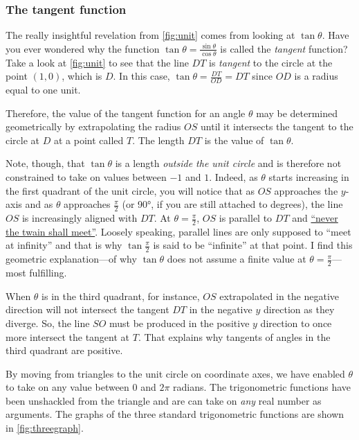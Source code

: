 \documentclass[
  a4paper,
]{article}
\begin{document}
\hypertarget{the-tangent-function}{%
\subsubsection{The tangent function}\label{the-tangent-function}}

The really insightful revelation from \cref{fig:unit} comes from looking
at \(\tan\theta\). Have you ever wondered why the function
\(\tan\theta = \frac{\sin\theta}{\cos\theta}\) is called the
\emph{tangent} function? Take a look at \cref{fig:unit} to see that the
line \(DT\) is \emph{tangent} to the circle at the point \((1, 0)\),
which is \(D\). In this case, \(\tan\theta = \frac{DT}{OD} = DT\) since
\(OD\) is a radius equal to one unit.

Therefore, the value of the tangent function for an angle \(\theta\) may
be determined geometrically by extrapolating the radius \(OS\) until it
intersects the tangent to the circle at \(D\) at a point called \(T\).
The length \(DT\) is the value of \(\tan\theta\).

Note, though, that \(\tan\theta\) is a length \emph{outside the unit
circle} and is therefore not constrained to take on values between
\(-1\) and \(1\). Indeed, as \(\theta\) starts increasing in the first
quadrant of the unit circle, you will notice that as \(OS\) approaches
the \(y\)-axis and as \(\theta\) approaches \(\frac{\pi}{2}\) (or 90°,
if you are still attached to degrees), the line \(OS\) is increasingly
aligned with \(DT\). At \(\theta=\frac{\pi}{2}\), \(OS\) is parallel to
\(DT\) and
\href{https://en.wikipedia.org/wiki/The_Ballad_of_East_and_West}{``never
the twain shall meet''}. Loosely speaking, parallel lines are only
supposed to ``meet at infinity'' and that is why \(\tan\frac{\pi}{2}\)
is said to be ``infinite'' at that point. I find this geometric
explanation---of why \(\tan\theta\) does not assume a finite value at
\(\theta=\frac{\pi}{2}\)---most fulfilling.

When \(\theta\) is in the third quadrant, for instance, \(OS\)
extrapolated in the negative direction will not intersect the tangent
\(DT\) in the negative \(y\) direction as they diverge. So, the line
\(SO\) must be produced in the positive \(y\) direction to once more
intersect the tangent at \(T\). That explains why tangents of angles in
the third quadrant are positive.

By moving from triangles to the unit circle on coordinate axes, we have
enabled \(\theta\) to take on any value between 0 and \(2\pi\) radians.
The trigonometric functions have been unshackled from the triangle and
are can take on \emph{any} real number as arguments. The graphs of the
three standard trigonometric functions are shown in
\cref{fig:threegraph}.
\end{document}
